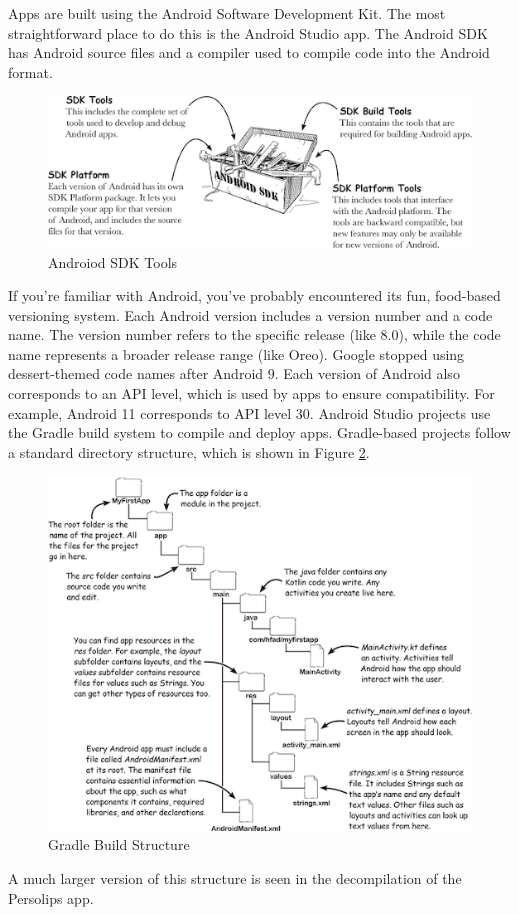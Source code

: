 Apps are built using the Android Software Development Kit. The most straightforward place to do this is the Android Studio app. The Android SDK has Android source files and a compiler used to compile code into the Android format.

\begin{figure}[H]
	\centering
	\includegraphics[width=0.7\linewidth]{android_sdk_tools.png}
	\caption{Androiod SDK Tools}
	\label{fig:androidsdktools}
\end{figure}

If you’re familiar with Android, you’ve probably encountered its fun, food-based versioning system. Each Android version includes a version number and a code name. The version number refers to the specific release (like 8.0), while the code name represents a broader release range (like Oreo). Google stopped using dessert-themed code names after Android 9. Each version of Android also corresponds to an API level, which is used by apps to ensure compatibility. For example, Android 11 corresponds to API level 30. Android Studio projects use the Gradle build system to compile and deploy apps. Gradle-based projects follow a standard directory structure, which is shown in Figure \ref{fig:gradlebuildstructure}.

\begin{figure}[H]
	\centering
	\includegraphics[width=0.7\linewidth]{gradle_build_structure.png}
	\caption{Gradle Build Structure}
	\label{fig:gradlebuildstructure}
\end{figure}
A much larger version of this structure is seen in the decompilation of the Persolips app. 

